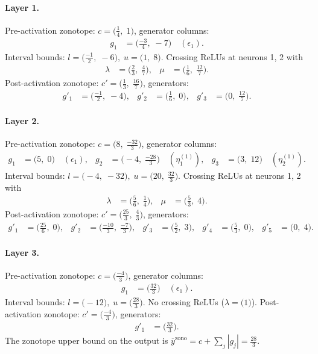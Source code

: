 \documentclass[11pt]{article}
\begin{document}
\paragraph{Layer 1.}
Pre-activation zonotope: $c = \bigl(\frac{1}{4},\; 1\bigr)$, generator columns:
\begin{align*}
g_{1} &= \bigl(\frac{-3}{4},\; -7\bigr) \quad (\epsilon_{1}).
\end{align*}
Interval bounds: $l = \bigl(\frac{-1}{2},\; -6\bigr), \; u = \bigl(1,\; 8\bigr)$. 
Crossing ReLUs at neurons 1, 2 with
\begin{align*}
\lambda &= \bigl(\frac{2}{3},\; \frac{4}{7}\bigr), & \mu &= \bigl(\frac{1}{6},\; \frac{12}{7}\bigr).
\end{align*}
Post-activation zonotope: $c' = \bigl(\frac{1}{3},\; \frac{16}{7}\bigr)$, generators:
\begin{align*}
g'_{1} &= \bigl(\frac{-1}{2},\; -4\bigr), &
g'_{2} &= \bigl(\frac{1}{6},\; 0\bigr), &
g'_{3} &= \bigl(0,\; \frac{12}{7}\bigr).
\end{align*}
\paragraph{Layer 2.}
Pre-activation zonotope: $c = \bigl(8,\; \frac{-32}{3}\bigr)$, generator columns:
\begin{align*}
g_{1} &= \bigl(5,\; 0\bigr) \quad (\epsilon_{1}), &
g_{2} &= \bigl(-4,\; \frac{-28}{3}\bigr) \quad (\eta^{(1)}_{1}), &
g_{3} &= \bigl(3,\; 12\bigr) \quad (\eta^{(1)}_{2}).
\end{align*}
Interval bounds: $l = \bigl(-4,\; -32\bigr), \; u = \bigl(20,\; \frac{32}{3}\bigr)$. 
Crossing ReLUs at neurons 1, 2 with
\begin{align*}
\lambda &= \bigl(\frac{5}{6},\; \frac{1}{4}\bigr), & \mu &= \bigl(\frac{5}{3},\; 4\bigr).
\end{align*}
Post-activation zonotope: $c' = \bigl(\frac{25}{3},\; \frac{4}{3}\bigr)$, generators:
\begin{align*}
g'_{1} &= \bigl(\frac{25}{6},\; 0\bigr), &
g'_{2} &= \bigl(\frac{-10}{3},\; \frac{-7}{3}\bigr), &
g'_{3} &= \bigl(\frac{5}{2},\; 3\bigr), &
g'_{4} &= \bigl(\frac{5}{3},\; 0\bigr), &
g'_{5} &= \bigl(0,\; 4\bigr).
\end{align*}
\paragraph{Layer 3.}
Pre-activation zonotope: $c = \bigl(\frac{-4}{3}\bigr)$, generator columns:
\begin{align*}
g_{1} &= \bigl(\frac{32}{3}\bigr) \quad (\epsilon_{1}).
\end{align*}
Interval bounds: $l = \bigl(-12\bigr), \; u = \bigl(\frac{28}{3}\bigr)$. 
No crossing ReLUs ($\lambda = \bigl(1\bigr)$).
Post-activation zonotope: $c' = \bigl(\frac{-4}{3}\bigr)$, generators:
\begin{align*}
g'_{1} &= \bigl(\frac{32}{3}\bigr).
\end{align*}
The zonotope upper bound on the output is $\overline{y}^{\text{zono}} = c + \sum_j |g_j| = \frac{28}{3}$.
\end{document}

